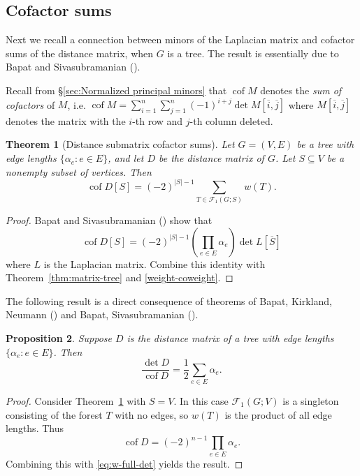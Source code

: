 \documentclass[12pt]{amsart}
\newtheorem{thm}{Theorem}[section]
\newtheorem{prop}[thm]{Proposition}
\theoremstyle{definition}
\newcommand{\Da}{{D}}
\newcommand{\La}{L}
\DeclareMathOperator{\cof}{cof}
\newcommand{\trees}{\mathcal{F}_1}
\begin{document}
\subsection{Cofactor sums}

Next we recall a connection between minors of the Laplacian matrix and cofactor sums of the distance matrix, when $G$ is a tree.
The result is essentially due to Bapat and Sivasubramanian (\cite{bapat-sivasubramanian}).

Recall from \S\ref{sec:Normalized principal minors} that $\cof M$ denotes the {\em sum of cofactors} of $M$, i.e. 
$\displaystyle
	\cof M = \sum_{i = 1}^{n} \sum_{j = 1}^{n} (-1)^{i + j} \det M[\overline{i}, \overline{j}]
$
where $M[\overline{i}, \overline{j}]$ denotes the matrix with the $i$-th row and $j$-th column deleted.

\begin{thm}[Distance submatrix cofactor sums]
\label{thm:distance-sub-cof}
Let $G = (V, E)$ be a tree with edge lengths $\{\alpha_e \colon e \in E\}$,
and let $\Da$ be the distance matrix of $G$.
Let $S \subseteq V$ be a nonempty subset of vertices. 
Then
\begin{equation}
	\cof \Da[S] = (-2)^{|S|-1} \sum_{T \in \trees(G; S)} w(T).
\end{equation}
\end{thm}
\begin{proof}
Bapat and Sivasubramanian (\cite[Theorem 11]{bapat-sivasubramanian})
show that
\[
	\cof \Da[S] = (-2)^{|S|-1} \left( \prod_{e \in E} \alpha_e \right) \det \La[\overline S] 
\]
where $\La$ is the Laplacian matrix.
Combine this identity with Theorem~\ref{thm:matrix-tree} and \eqref{weight-coweight}.
\end{proof}

The following result is a direct consequence of theorems of Bapat, Kirkland, Neumann (\cite{bapat-kirkland-neumann}) and Bapat, Sivasubramanian (\cite{bapat-sivasubramanian}).

\begin{prop}
\label{prop:full-det-cof-ratio}
Suppose $\Da$ is the distance matrix of a tree with edge lengths $\{\alpha_e \colon e \in E\}$.
Then
\[
	\frac{\det \Da}{\cof \Da} = \frac1{2} \sum_{e \in E} \alpha_e .
\]
\end{prop}
\begin{proof}
Consider Theorem~\ref{thm:distance-sub-cof} with $S = V$.
In this case $\trees(G; V)$ is a singleton consisting of the forest $T$ with no edges, so $w({T})$ is the product of all edge lengths.
Thus
\[
	\cof \Da = (-2)^{n - 1} \prod_{e \in E} \alpha_e .
\]
Combining this with \eqref{eq:w-full-det} yields the result.
\end{proof}
\end{document}
